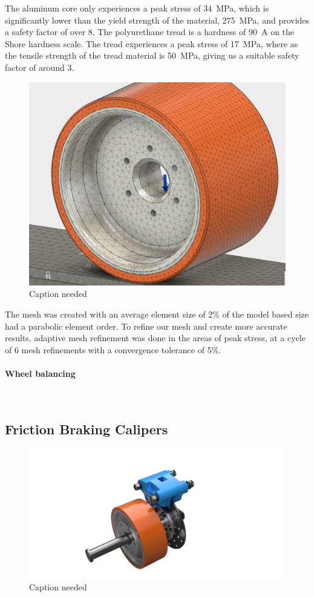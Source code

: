 \documentclass{report}
\let\oldparagraph\paragraph
\renewcommand{\paragraph}[1]{\oldparagraph{#1}\mbox{}\\}
\begin{document}
    The aluminum core only experiences a peak stress of \SI{34}{MPa}, which is significantly lower than the yield strength of the material, \SI{275}{MPa}, and provides a safety factor of over 8. The polyurethane tread is a hardness of \SI{90}{A} on the Shore hardness scale. The tread experiences a peak stress of \SI{17}{MPa}, where as the tensile strength of the tread material is \SI{50}{MPa}, giving us a suitable safety factor of around 3.
    \begin{figure}[H]
        \centering
        \includegraphics[width=\linewidth]{fig22}
        \caption{Caption needed}
    \end{figure}
    The mesh was created with an average element size of 2\% of the model based size had a parabolic element order. To refine our mesh and create more accurate results, adaptive mesh refinement was done in the areas of peak stress, at a cycle of 6 mesh refinements with a convergence tolerance of 5\%.

    \paragraph{Wheel balancing}
    \subsection{Friction Braking Calipers}
    \begin{figure}[H]
        \centering
        \includegraphics[width=\linewidth]{fig23}
        \caption{Caption needed}
    \end{figure}
\end{document}

